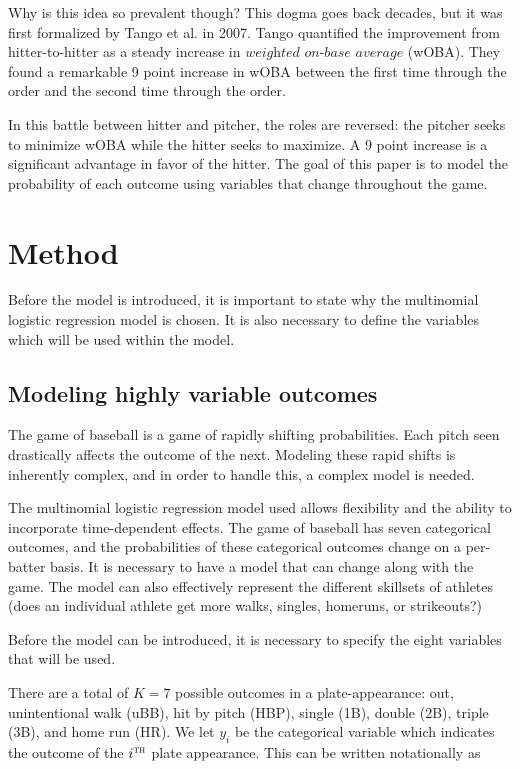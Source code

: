\documentclass[a4paper,12pt]{article}
\begin{document}
Why is this idea so prevalent though? This dogma goes back decades, but it was first formalized by Tango et al. in 2007. Tango quantified the improvement from hitter-to-hitter as a steady increase in $\textit{weighted on-base average}$ (wOBA). They found a remarkable 9 point increase in wOBA between the first time through the order and the second time through the order.

In this battle between hitter and pitcher, the roles are reversed: the pitcher seeks to minimize wOBA while the hitter seeks to maximize. A 9 point increase is a significant advantage in favor of the hitter. The goal of this paper is to model the probability of each outcome using variables that change throughout the game.

\section{Method}
Before the model is introduced, it is important to state why the multinomial logistic regression model is chosen. It is also necessary to define the variables which will be used within the model.

\subsection{Modeling highly variable outcomes}
The game of baseball is a game of rapidly shifting probabilities. Each pitch seen drastically affects the outcome of the next. Modeling these rapid shifts is inherently complex, and in order to handle this, a complex model is needed.

The multinomial logistic regression model used allows flexibility and the ability to incorporate time-dependent effects. The game of baseball has seven categorical outcomes, and the probabilities of these categorical outcomes change on a per-batter basis. It is necessary to have a model that can change along with the game. The model can also effectively represent the different skillsets of athletes (does an individual athlete get more walks, singles, homeruns, or strikeouts?)

Before the model can be introduced, it is necessary to specify the eight variables that will be used.

There are a total of $ K = 7$ possible outcomes in a plate-appearance: out, unintentional walk (uBB), hit by pitch (HBP), single (1B), double (2B), triple (3B), and home run (HR). We let $y_i$ be the categorical variable which indicates the outcome of the $i^{\textsc{th}}$ plate appearance. This can be written notationally as
\end{document}
